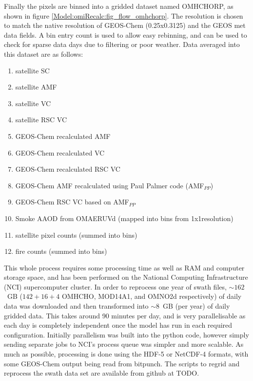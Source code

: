     Finally the pixels are binned into a gridded dataset named OMHCHORP, as shown in figure \ref{Model:omiRecalc:fig_flow_omhchorp}.
    The resolution is chosen to match the native resolution of GEOS-Chem (0.25x0.3125\degr) and the GEOS met data fields.
    A bin entry count is used to allow easy rebinning, and can be used to check for sparse data days due to filtering or poor weather.
    Data averaged into this dataset are as follows:
    \begin{enumerate}
      \item satellite SC %
      \item satellite AMF %
      \item satellite VC %
      \item satellite RSC VC %
      \item GEOS-Chem recalculated AMF %
      \item GEOS-Chem recalculated VC %
      \item GEOS-Chem recalculated RSC VC %
      \item GEOS-Chem AMF recalculated using Paul Palmer code (AMF$_{PP}$)
      \item GEOS-Chem RSC VC based on AMF$_{PP}$
      \item Smoke AAOD from OMAERUVd (mapped into bins from 1x1\degr resolution)
      \item satellite pixel counts (summed into bins)
      \item fire counts (summed into bins)
    \end{enumerate}
    
    This whole process requires some processing time as well as RAM and computer storage space, and has been performed on the National Computing Infrastructure (NCI) supercomputer cluster.
    In order to reprocess one year of swath files, $\sim 162$~GB ($142 + 16 + 4$ OMHCHO, MOD14A1, and OMNO2d respectively) of daily data was downloaded and then transformed into $\sim 8$~GB (per year) of daily gridded data.
    This takes around 90 minutes per day, and is very parallelisable as each day is completely independent once the model has run in each required configuration.
    Initially parallelism was built into the python code, however simply sending separate jobs to NCI's process queue was simpler and more scalable.
    As much as possible, processing is done using the HDF-5 or NetCDF-4 formats, with some GEOS-Chem output being read from bitpunch.
    The scripts to regrid and reprocess the swath data set are available from github at TODO.
  
